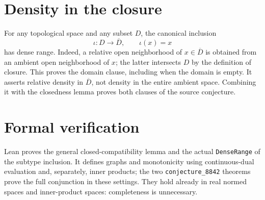 \documentclass[10pt,a4paper]{article}
\begin{document}
\section*{Density in the closure}
For any topological space and any subset $D$, the canonical inclusion
\[
\iota:D\longrightarrow\overline D,\qquad \iota(x)=x
\]
has dense range. Indeed, a relative open neighborhood of
$x\in\overline D$ is obtained from an ambient open neighborhood of $x$;
the latter intersects $D$ by the definition of closure.
This proves the domain clause, including when the domain is empty.
It asserts relative density in $\overline D$, not density in the entire
ambient space. Combining it with the closedness lemma proves both
clauses of the source conjecture.

\section*{Formal verification}
Lean proves the general closed-compatibility lemma and the actual
\texttt{DenseRange} of the subtype inclusion. It defines graphs and
monotonicity using continuous-dual evaluation and, separately, inner
products; the two \texttt{conjecture\_8842} theorems prove the full
conjunction in these settings. They hold already in real normed spaces
and inner-product spaces: completeness is unnecessary.
\end{document}
